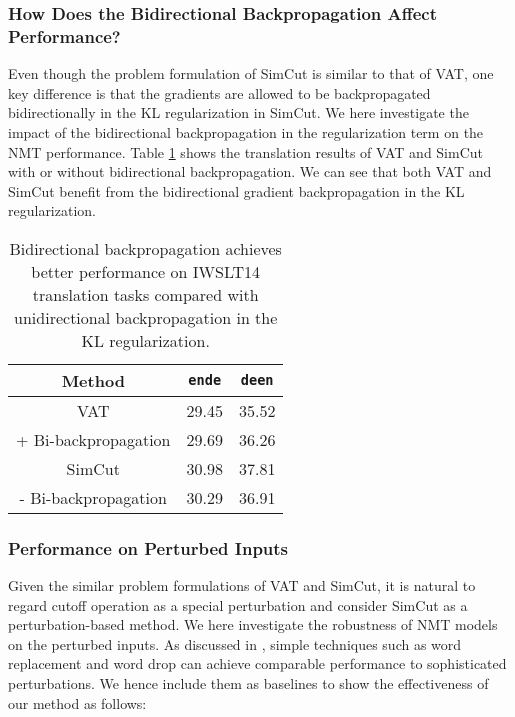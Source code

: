 \documentclass[11pt]{article}
\begin{document}
\subsubsection{How Does the Bidirectional Backpropagation Affect Performance?}

Even though the problem formulation of SimCut is similar to that of VAT, one key difference is that the gradients are allowed to be backpropagated bidirectionally in the KL regularization in SimCut. We here investigate the impact of the bidirectional backpropagation in the regularization term on the NMT performance. Table \ref{bi-back-prop} shows the translation results of VAT and SimCut with or without bidirectional backpropagation. We can see that both VAT and SimCut benefit from the bidirectional gradient backpropagation in the KL regularization.

\begin{table}
\centering
\begin{tabular}{c|c|c}
\hline
Method & \texttt{en}\texttt{de} & \texttt{de}\texttt{en} \\
\hline\hline
VAT & 29.45 & 35.52 \\
+ Bi-backpropagation & 29.69 & 36.26 \\
\hline
SimCut & 30.98 & 37.81 \\
- Bi-backpropagation & 30.29 & 36.91 \\
\end{tabular}
\caption{Bidirectional backpropagation achieves better performance on IWSLT14  translation tasks compared with unidirectional backpropagation in the KL regularization. \label{bi-back-prop}}
\end{table}

\subsubsection{Performance on Perturbed Inputs}

Given the similar problem formulations of VAT and SimCut, it is natural to regard cutoff operation as a special perturbation and consider SimCut as a perturbation-based method. We here investigate the robustness of NMT models on the perturbed inputs. As discussed in \citet{takase2021rethinking}, simple techniques such as word replacement and word drop can achieve comparable performance to sophisticated perturbations. We hence include them as baselines to show the effectiveness of our method as follows:
\end{document}
